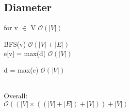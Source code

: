 \documentclass[titlepage]{article}
\begin{document}
  \begin{minipage}[t]{0.33\linewidth}
    \subsection{Diameter}
      \begin{adjustwidth}{2em}{0pt}
      for v $\in$ V \hfill $\mathcal{O} \left( |V| \right)$
      \begin{adjustwidth}{1em}{0pt}
        BFS(v) \hfill $\mathcal{O} \left( |V| + |E| \right)$\\
        e[v] = max(d) \hfill $\mathcal{O} \left( |V| \right)$
        \end{adjustwidth}
        d = max(e) \hfill $\mathcal{O} \left( |V| \right)$
      \end{adjustwidth}
      \ \\
      Overall: \\

      $ \mathcal{O} \left( \left(|V| \times \left( \left( |V| + |E| \right) + |V| \right) \right) + |V| \right)$
  \end{minipage}
\end{document}
